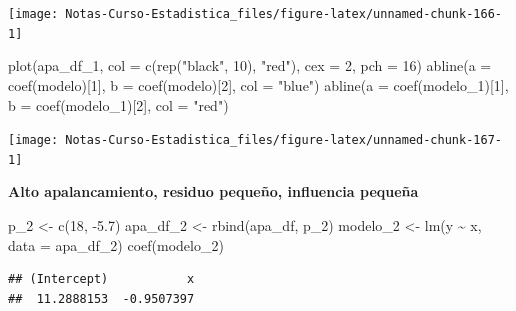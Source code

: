 \documentclass[
  12pt,
]{book}
\newenvironment{Shaded}{\begin{snugshade}}{\end{snugshade}}
\newcommand{\AttributeTok}[1]{\textcolor[rgb]{0.77,0.63,0.00}{#1}}
\newcommand{\DecValTok}[1]{\textcolor[rgb]{0.00,0.00,0.81}{#1}}
\newcommand{\FloatTok}[1]{\textcolor[rgb]{0.00,0.00,0.81}{#1}}
\newcommand{\FunctionTok}[1]{\textcolor[rgb]{0.00,0.00,0.00}{#1}}
\newcommand{\NormalTok}[1]{#1}
\newcommand{\OtherTok}[1]{\textcolor[rgb]{0.56,0.35,0.01}{#1}}
\newcommand{\SpecialCharTok}[1]{\textcolor[rgb]{0.00,0.00,0.00}{#1}}
\newcommand{\StringTok}[1]{\textcolor[rgb]{0.31,0.60,0.02}{#1}}
\begin{document}
\begin{center}\texttt{[image: Notas-Curso-Estadistica\_files/figure-latex/unnamed-chunk-166-1]} \end{center}

\begin{Shaded}
\begin{Highlighting}[]
\FunctionTok{plot}\NormalTok{(apa\_df\_1, }\AttributeTok{col =} \FunctionTok{c}\NormalTok{(}\FunctionTok{rep}\NormalTok{(}\StringTok{"black"}\NormalTok{, }\DecValTok{10}\NormalTok{), }\StringTok{"red"}\NormalTok{), }\AttributeTok{cex =} \DecValTok{2}\NormalTok{,}
    \AttributeTok{pch =} \DecValTok{16}\NormalTok{)}
\FunctionTok{abline}\NormalTok{(}\AttributeTok{a =} \FunctionTok{coef}\NormalTok{(modelo)[}\DecValTok{1}\NormalTok{], }\AttributeTok{b =} \FunctionTok{coef}\NormalTok{(modelo)[}\DecValTok{2}\NormalTok{], }\AttributeTok{col =} \StringTok{"blue"}\NormalTok{)}
\FunctionTok{abline}\NormalTok{(}\AttributeTok{a =} \FunctionTok{coef}\NormalTok{(modelo\_1)[}\DecValTok{1}\NormalTok{], }\AttributeTok{b =} \FunctionTok{coef}\NormalTok{(modelo\_1)[}\DecValTok{2}\NormalTok{],}
    \AttributeTok{col =} \StringTok{"red"}\NormalTok{)}
\end{Highlighting}
\end{Shaded}

\begin{center}\texttt{[image: Notas-Curso-Estadistica\_files/figure-latex/unnamed-chunk-167-1]} \end{center}

\textbf{Alto apalancamiento, residuo pequeño, influencia pequeña}

\begin{Shaded}
\begin{Highlighting}[]
\NormalTok{p\_2 }\OtherTok{\textless{}{-}} \FunctionTok{c}\NormalTok{(}\DecValTok{18}\NormalTok{, }\SpecialCharTok{{-}}\FloatTok{5.7}\NormalTok{)}
\NormalTok{apa\_df\_2 }\OtherTok{\textless{}{-}} \FunctionTok{rbind}\NormalTok{(apa\_df, p\_2)}
\NormalTok{modelo\_2 }\OtherTok{\textless{}{-}} \FunctionTok{lm}\NormalTok{(y }\SpecialCharTok{\textasciitilde{}}\NormalTok{ x, }\AttributeTok{data =}\NormalTok{ apa\_df\_2)}
\FunctionTok{coef}\NormalTok{(modelo\_2)}
\end{Highlighting}
\end{Shaded}

\begin{verbatim}
## (Intercept)           x 
##  11.2888153  -0.9507397
\end{verbatim}
\end{document}
